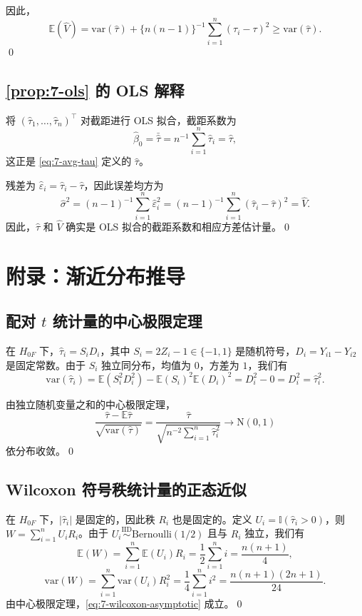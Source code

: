 因此，
\[
\mathbb{E}(\hat V) = \text{var}(\hat\tau) + \{n(n-1)\}^{-1} \sum_{i=1}^n (\tau_i - \tau)^2 \geq \text{var}(\hat\tau).
\]\qed

\subsection{\cref{prop:7-ols} 的 OLS 解释}\label{sec:appendix-7-ols-proof}

将 $(\hat\tau_1, \dots, \hat\tau_n)^\top$ 对截距进行 OLS 拟合，截距系数为
\[
\hat\beta_0 = \bar{\hat\tau} = n^{-1} \sum_{i=1}^n \hat\tau_i = \hat\tau,
\]
这正是 \cref{eq:7-avg-tau} 定义的 $\hat\tau$。

残差为 $\hat\varepsilon_i = \hat\tau_i - \hat\tau$，因此误差均方为
\[
\hat\sigma^2 = (n-1)^{-1} \sum_{i=1}^n \hat\varepsilon_i^2 = (n-1)^{-1} \sum_{i=1}^n (\hat\tau_i - \hat\tau)^2 = \hat V.
\]
因此，$\hat\tau$ 和 $\hat V$ 确实是 OLS 拟合的截距系数和相应方差估计量。\qed

\section{附录：渐近分布推导}\label{sec:appendix-7-asymptotics}

\subsection{配对 $t$ 统计量的中心极限定理}\label{sec:appendix-7-clt}

在 $H_{0F}$ 下，$\hat\tau_i = S_i D_i$，其中 $S_i = 2Z_i - 1 \in \{-1, 1\}$ 是随机符号，$D_i = Y_{i1} - Y_{i2}$ 是固定常数。由于 $S_i$ 独立同分布，均值为 $0$，方差为 $1$，我们有
\[
\text{var}(\hat\tau_i) = \mathbb{E}(S_i^2 D_i^2) - \mathbb{E}(S_i)^2 \mathbb{E}(D_i)^2 = D_i^2 - 0 = D_i^2 = \hat\tau_i^2.
\]

由独立随机变量之和的中心极限定理，
\[
\frac{\hat\tau - \mathbb{E}\hat\tau}{\sqrt{\text{var}(\hat\tau)}} = \frac{\hat\tau}{\sqrt{n^{-2} \sum_{i=1}^n \hat\tau_i^2}} \to \mathrm{N}(0, 1)
\]
依分布收敛。\qed

\subsection{Wilcoxon 符号秩统计量的正态近似}\label{sec:appendix-7-wilcoxon}

在 $H_{0F}$ 下，$|\hat\tau_i|$ 是固定的，因此秩 $R_i$ 也是固定的。定义 $U_i = \mathbb{I}(\hat\tau_i > 0)$，则 $W = \sum_{i=1}^n U_i R_i$。由于 $U_i \stackrel{\text{IID}}{\sim} \text{Bernoulli}(1/2)$ 且与 $R_i$ 独立，我们有
\[
\mathbb{E}(W) = \sum_{i=1}^n \mathbb{E}(U_i) R_i = \frac{1}{2} \sum_{i=1}^n i = \frac{n(n+1)}{4},
\]
\[
\text{var}(W) = \sum_{i=1}^n \text{var}(U_i) R_i^2 = \frac{1}{4} \sum_{i=1}^n i^2 = \frac{n(n+1)(2n+1)}{24}.
\]
由中心极限定理，\cref{eq:7-wilcoxon-asymptotic} 成立。\qed


